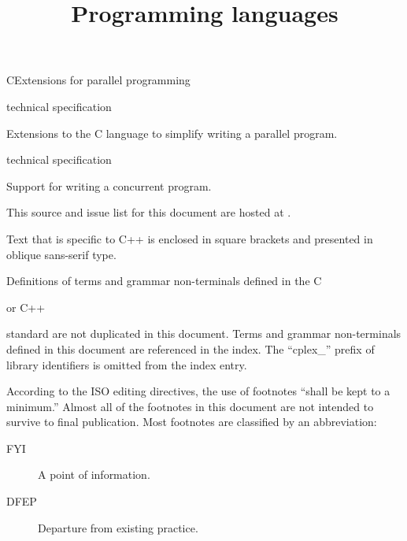 \documentclass[
	techspec,	%
	final,		%
	notcopyright,	%
	letterpaper	%
	]{isov2}
\begin{document}
\title{Programming languages}{C}{Extensions for parallel programming}

\scopeclause
\begin{inscope}{technical specification}
\item
Extensions to the C language to simplify writing a parallel program.
\end{inscope}
\begin{outofscope}{technical specification}
\item
Support for writing a concurrent program.
\end{outofscope}

\normrefsclause
{}
\begin{nreferences}
\end{nreferences}




\pnum
This source and issue list for this document are hosted at
.

\pnum
\begin{cpp}
Text that is specific to C++
is enclosed in square brackets
and presented in oblique sans-serif type.
\end{cpp}

\pnum
Definitions of terms and grammar non-terminals defined in the C
\begin{cpp}
or C++
\end{cpp}
standard are not duplicated in this document.
Terms and grammar non-terminals defined in this document
are referenced in the index.
The ``cplex_'' prefix of library identifiers
is omitted from the index entry.

\pnum
According to the ISO editing directives,
the use of footnotes
``shall be kept to a minimum.''
Almost all of the footnotes in this document
are not intended to survive to final publication.
Most footnotes are classified by an abbreviation:
\begin{description}
\item[FYI]
A point of information.
\item[DFEP]
Departure from existing practice.
\end{description}

\begin{comment}
\pnum
Annex A contains information
concerning the editing of the LaTeX source of this document.
It will not survive to final publication.
\end{comment}
\end{document}
